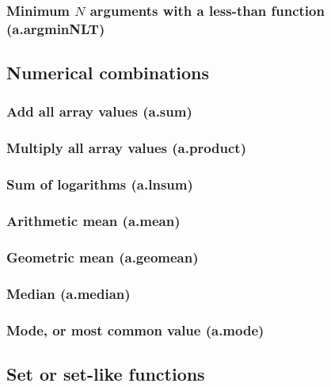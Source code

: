 \documentclass{article}
\theoremstyle{definition}
\begin{document}
\subsubsection{Minimum $N$ arguments with a less-than function (a.argminNLT)}

\subsection{Numerical combinations}

\subsubsection{Add all array values (a.sum)}

\subsubsection{Multiply all array values (a.product)}

\subsubsection{Sum of logarithms (a.lnsum)}

\subsubsection{Arithmetic mean (a.mean)}

\subsubsection{Geometric mean (a.geomean)}

\subsubsection{Median (a.median)}

\subsubsection{Mode, or most common value (a.mode)}

\hypertarget{hsec:set-like}{}
\subsection{Set or set-like functions}
\label{sec:set-like}
\end{document}
